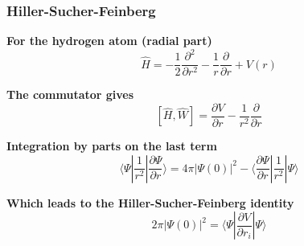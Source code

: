 \begin{frame}
\frametitle{Hiller-Sucher-Feinberg}
\centering
\textbf{For the hydrogen atom (radial part)}
\begin{equation}
    \nonumber
    \hat{H} = -\frac{1}{2}\frac{\partial^2}{\partial r^2}
              -\frac{1}{r}\frac{\partial}{\partial r}
              + V(r)
\end{equation}

\vspace{5mm}

\pause
\centering
\textbf{The commutator gives}
\begin{equation}
    \nonumber
    \left[\hat{H},\hat{W}\right] =
    \frac{\partial V}{\partial r}
    -\frac{1}{r^2}\frac{\partial}{\partial r}
\end{equation}

\vspace{5mm}

\pause
\textbf{Integration by parts on the last term}
\begin{equation}
    \nonumber
    \langle\Psi|\frac{1}{r^2}|\frac{\partial\Psi}{\partial r}\rangle =
    4\pi|\Psi(0)|^2 - 
    \langle\frac{\partial\Psi}{\partial r}|\frac{1}{r^2}|\Psi\rangle
\end{equation}

\vspace{5mm}

\pause
\textbf{Which leads to the Hiller-Sucher-Feinberg identity}
\begin{equation}
    \nonumber
    2\pi|\Psi(0)|^2 =
    \langle\Psi|\frac{\partial V}{\partial r_i}
    | \Psi\rangle
\end{equation}

\end{frame}

